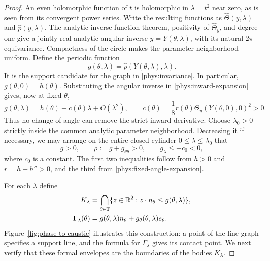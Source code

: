 \begin{proof}
An even holomorphic function of \(t\) is holomorphic in
\(\lambda=t^2\) near zero, as is seen from its convergent power series.
Write the resulting functions as
\(\widehat\Theta(y,\lambda)\) and \(\widehat p(y,\lambda)\).
The analytic inverse function theorem, positivity of
\(\widehat\Theta_y\), and degree one give a jointly real-analytic angular
inverse \(y=Y(\theta,\lambda)\), with its natural \(2\pi\)-equivariance.
Compactness of the circle makes the parameter neighborhood uniform.
Define the periodic function
\[
 g(\theta,\lambda)=\widehat p(Y(\theta,\lambda),\lambda).
\]
It is the support candidate for the graph in \eqref{phys:invariance}.
In particular, \(g(\theta,0)=h(\theta)\). Substituting the angular
inverse in \eqref{phys:inward-expansion} gives, now at fixed \(\theta\),
\begin{equation}\label{phys:fixed-angle-expansion}
 g(\theta,\lambda)=h(\theta)-c(\theta)\lambda+O(\lambda^2),
 \qquad
 c(\theta)=\frac18r(\theta)
       \Theta_y(Y(\theta,0),0)^2>0.
\end{equation}
Thus no change of angle can remove the strict inward derivative.
Choose \(\lambda_0>0\) strictly inside the common analytic parameter
neighborhood. Decreasing it if necessary, we may arrange on the entire
closed cylinder \(0\leq\lambda\leq\lambda_0\) that
\begin{equation}\label{phys:support-inequalities}
 g>0,\qquad
 \rho:=g+g_{\theta\theta}>0,\qquad
 g_\lambda\leq-c_0<0,
\end{equation}
where \(c_0\) is a constant. The first two inequalities follow from
\(h>0\) and \(r=h+h''>0\), and the third from
\eqref{phys:fixed-angle-expansion}.

For each \(\lambda\) define
\begin{equation}\label{phys:body-and-boundary}
 \begin{split}
 K_\lambda
   &=\bigcap_{\theta\in\mathbb{T}}
       \{z\in\mathbb{R}^2:z\cdot n_\theta\leq g(\theta,\lambda)\},\\
 \Gamma_\lambda(\theta)
   &=g(\theta,\lambda)n_\theta
     +g_\theta(\theta,\lambda)e_\theta.
 \end{split}
\end{equation}
Figure~\ref{fig:phase-to-caustic} illustrates this construction: a point
of the line graph specifies a support line, and the formula for
$\Gamma_\lambda$ gives its contact point. We next verify that these
formal envelopes are the boundaries of the bodies $K_\lambda$.




\end{proof}
